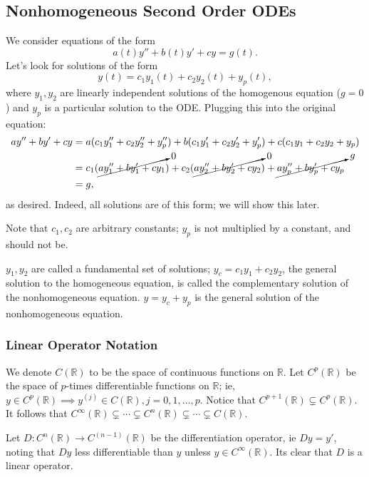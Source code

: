 \subsection{Nonhomogeneous Second Order ODEs}

We consider equations of the form \[
a(t) y'' + b(t) y' + cy = g(t)   .
\]
Let's look for solutions of the form \[
y(t) = c_1y_1(t) + c_2y_2(t) + y_p(t)    ,
\]
where $y_1, y_2$ are linearly independent solutions of the homogenous equation ($g = 0$) and $y_p$ is a particular solution to the ODE. Plugging this into the original equation:
\begin{align*}
    ay''+by'+cy &= a(c_1y_1''+c_2y_2''+y_p'')+b(c_1y_1'+c_2y_2'+y_p') + c(c_1y_1+c_2y_2+y_p)\\
    &= c_1(\cancelto{0}{a y_1'' + by_1' + cy_1}) + c_2(\cancelto{0}{ay_2''+by_2' + c y_2}) + \cancelto{g}{a y_p'' + b y_p' + cy_p}\\
    &= g,
\end{align*}
as desired. Indeed, all solutions are of this form; we will show this later.

\begin{remark}
    Note that $c_1, c_2$ are arbitrary constants; $y_p$ is not multiplied by a constant, and should not be.
\end{remark}

\begin{remark}
    $y_1, y_2$ are called a fundamental set of solutions; $y_c = c_1 y_1 + c_2 y_2$, the general solution to the homogeneous equation, is called the complementary solution of the nonhomogeneous equation. $y = y_c + y_p$ is the general solution of the nonhomogeneous equation.
\end{remark}

\subsubsection{Linear Operator Notation}
We denote $C(\mathbb{R})$ to be the space of continuous functions on $\mathbb{R}$. Let $C^p(\mathbb{R})$ be the space of $p$-times differentiable functions on $\mathbb{R}$; ie, $y \in C^{p}(\mathbb{R}) \implies y ^{(j)} \in C(\mathbb{R}), j = 0, 1, \dots, p$. Notice that $C^{p + 1}(\mathbb{R}) \subsetneq C^p(\mathbb{R})$. It follows that $C^{\infty}(\mathbb{R}) \subsetneq \cdots \subsetneq C^{n}(\mathbb{R}) \subsetneq \cdots \subsetneq C(\mathbb{R})$.

Let $D : C^{n}(\mathbb{R}) \to C^{(n-1)}(\mathbb{R})$ be the differentiation operator, ie $Dy = y'$, noting that $Dy$ less differentiable than $y$ unless $y \in C^{\infty}(\mathbb{R})$. Its clear that $D$ is a linear operator.

